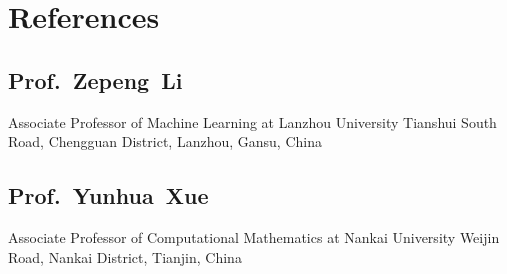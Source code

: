 \documentclass[11pt,a4paper, final]{moderncv}
\newcommand{\spacesubsection}{\vspace{0.2cm}}
\begin{document}
\section{\textbf{References}}
	\subsection{\textbf{Prof.~Zepeng~Li}}
		\cvline{}
		{Associate Professor of Machine Learning at Lanzhou University}
		{Tianshui South Road, Chengguan District, Lanzhou, Gansu, China}
	\subsection{\textbf{Prof.~Yunhua~Xue}}
		\cvline{}
		{Associate Professor of Computational Mathematics at Nankai University}
		{Weijin Road, Nankai District, Tianjin, China}





\clearpage
\end{document}
